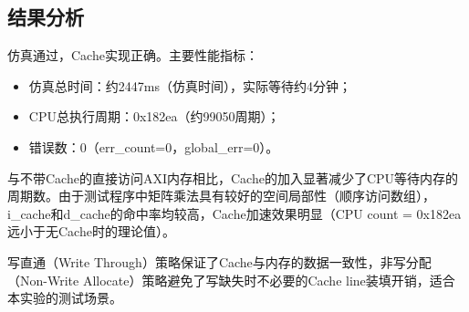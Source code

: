 \subsection{结果分析}

仿真通过，Cache实现正确。主要性能指标：

\begin{itemize}
    \item 仿真总时间：约2447ms（仿真时间），实际等待约4分钟；
    \item CPU总执行周期：0x182ea（约99050周期）；
    \item 错误数：0（err\_count=0，global\_err=0）。
\end{itemize}

与不带Cache的直接访问AXI内存相比，Cache的加入显著减少了CPU等待内存的周期数。由于测试程序中矩阵乘法具有较好的空间局部性（顺序访问数组），i\_cache和d\_cache的命中率均较高，Cache加速效果明显（CPU count = 0x182ea远小于无Cache时的理论值）。

写直通（Write Through）策略保证了Cache与内存的数据一致性，非写分配（Non-Write Allocate）策略避免了写缺失时不必要的Cache line装填开销，适合本实验的测试场景。
